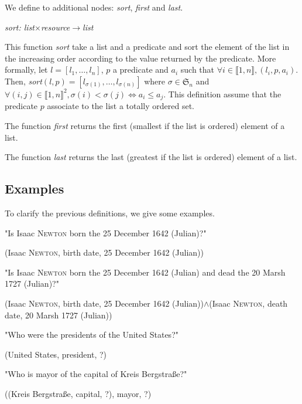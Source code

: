 We define to additional nodes: \textsl{sort}, \textsl{first} and \textsl{last}.

\begin{center}
\textsl{sort: list$\times$resource$\rightarrow$list}
\end{center}
This function \textsl{sort} take a list and a predicate and sort the element of the list in the increasing order according to the value returned by the predicate. More formally, let $l=[l_1,\ldots,l_n]$, $p$ a predicate and $a_i$ such that $\forall i\in\llbracket1,n\rrbracket, (l_i,p,a_i)$. Then, \textsl{sort}$(l,p) = [l_{\sigma(1)},\ldots,l_{\sigma(n)}]$ where $\sigma\in\mathfrak{S}_n$ and $\forall (i,j)\in\llbracket 1,n\rrbracket^2, \sigma(i)<\sigma(j) \Leftrightarrow a_i \leqslant a_j$. This definition assume that the predicate $p$ associate to the list a totally ordered set.

The function \textsl{first} returns the first (smallest if the list is ordered) element of a list.

The function \textsl{last} returns the last (greatest if the list is ordered) element of a list.

\subsection{Examples}

To clarify the previous definitions, we give some examples.

\bigskip

"Is Isaac \textsc{Newton} born the 25 December 1642 (Julian)?"
\begin{center}(Isaac \textsc{Newton}, birth date, 25 December 1642 (Julian))\end{center}

\bigskip

"Is Isaac \textsc{Newton} born the 25 December 1642 (Julian) and dead the 20 Marsh 1727 (Julian)?"
\begin{center}(Isaac \textsc{Newton}, birth date, 25 December 1642 (Julian))$\wedge$(Isaac \textsc{Newton}, death date, 20 Marsh 1727 (Julian))\end{center}

\bigskip

"Who were the presidents of the United States?"
\begin{center}(United States, president, ?)\end{center}

\bigskip

"Who is mayor of the capital of Kreis Bergstraße?"
\begin{center}((Kreis Bergstraße, capital, ?), mayor, ?)\end{center}


